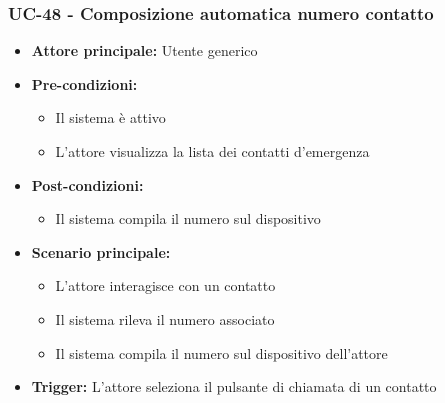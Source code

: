 \documentclass[a4paper,12pt]{article}
\begin{document}
\subsubsection{UC-48 - Composizione automatica numero contatto} \label{sec:UC-48}
\begin{itemize}
    \item \textbf{Attore principale:} Utente generico
    \item \textbf{Pre-condizioni:}
    \begin{itemize}
        \item Il sistema è attivo
        \item L'attore visualizza la lista dei contatti d'emergenza
    \end{itemize}
    \item \textbf{Post-condizioni:}
    \begin{itemize}
        \item Il sistema compila il numero sul dispositivo
    \end{itemize}
    \item \textbf{Scenario principale:} 
    \begin{itemize}
        \item L'attore interagisce con un contatto
        \item Il sistema rileva il numero associato
        \item Il sistema compila il numero sul dispositivo dell'attore
    \end{itemize}
    \item \textbf{Trigger:} L'attore seleziona il pulsante di chiamata di un contatto
\end{itemize}
\end{document}
